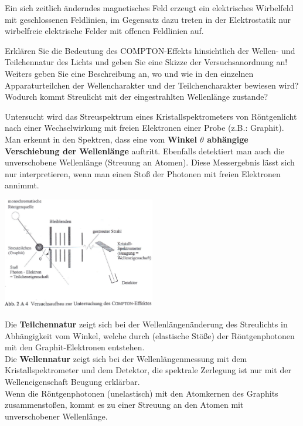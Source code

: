 \documentclass[12pt,a4paper,ngerman]{article}
\begin{document}
Ein sich zeitlich änderndes magnetisches Feld erzeugt ein elektrisches Wirbelfeld mit geschlossenen Feldlinien, im Gegensatz dazu treten in der Elektrostatik nur wirbelfreie elektrische Felder mit offenen Feldlinien auf. 

\pagebreak

\begin{framed}
Erklären Sie die Bedeutung des COMPTON-Effekts hinsichtlich der Wellen- und Teilchennatur des Lichts und geben Sie eine Skizze der Versuchsanordnung an! 
Weiters geben Sie eine Beschreibung an, wo und wie in den einzelnen Apparaturteilchen der Wellencharakter und der Teilchencharakter bewiesen wird? Wodurch kommt Streulicht mit der eingestrahlten Wellenlänge zustande?
\end{framed}




Untersucht wird das Streuspektrum eines Kristallspektrometers von Röntgenlicht nach einer Wechselwirkung mit freien Elektronen einer Probe (z.B.: Graphit). Man erkennt in den Spektren, dass eine vom \textbf{Winkel $\theta$ abhängige Verschiebung der Wellenlänge} auftritt. Ebenfalls detektiert man auch die unverschobene Wellenlänge (Streuung an Atomen). Diese Messergebnis lässt sich nur interpretieren, wenn man einen Stoß der Photonen mit freien Elektronen annimmt.

\begin{center}
\includegraphics[width=0.5\textwidth]{compton.png} 
\end{center}

Die \textbf{Teilchennatur} zeigt sich bei der Wellenlängenänderung des Streulichts in Abhängigkeit vom Winkel, welche durch (elastische Stöße) der Röntgenphotonen mit den Graphit-Elektronen entstehen. \\ Die \textbf{Wellennatur} zeigt sich bei der Wellenlängenmessung mit dem Kristallspektrometer und dem Detektor, die spektrale Zerlegung ist nur mit der Welleneigenschaft Beugung erklärbar. \\
Wenn die Röntgenphotonen (unelastisch) mit den Atomkernen des Graphits zusammenstoßen, kommt es zu einer Streuung an den Atomen mit unverschobener Wellenlänge. 
\end{document}
